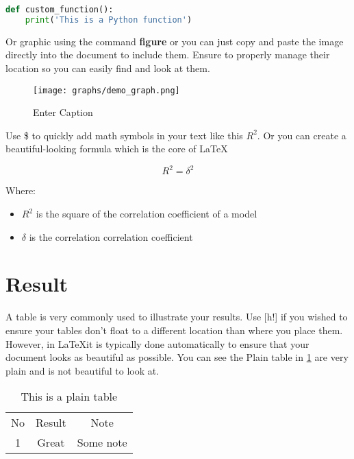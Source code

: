 \documentclass[12pt, a4paper]{article}
\begin{document}
\begin{lstlisting}[caption=This is a code, language=Python, label=my code]
def custom_function():
    print('This is a Python function')
\end{lstlisting}

Or graphic using the command \textbf{figure} or you can just copy and paste the image directly into the document to include them. Ensure to properly manage their location so you can easily find and look at them.

\begin{figure}
    \centering
    \texttt{[image: graphs/demo\_graph.png]}
    \caption{Enter Caption}
    \label{fig:enter-label}
\end{figure}

Use \$ to quickly add math symbols in your text like this $R^2$. Or you can create a beautiful-looking formula which is the core of \LaTeX

\[
R^2 = \delta^2
\]

Where: 

\begin{itemize}
    \item $R^2$ is the square of the correlation coefficient of a model
    \item $\delta$ is the correlation correlation coefficient
\end{itemize}

\section{Result}

A table is very commonly used to illustrate your results. Use [h!] if you wished to ensure your tables don't float to a different location than where you place them. However, in \LaTeX it is typically done automatically to ensure that your document looks as beautiful as possible. You can see the Plain table in \ref{tab:plan_table} are very plain and is not beautiful to look at.

\begin{table}[h!]
    \centering
    \begin{tabular}{ccc}
        No & Result & Note \\
        1 & Great & Some note\\
    \end{tabular}
    \caption{This is a plain table}
    \label{tab:plan_table}
\end{table}
\end{document}
